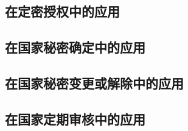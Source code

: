 \subsection{在定密授权中的应用}
\subsection{在国家秘密确定中的应用}
\subsection{在国家秘密变更或解除中的应用}
\subsection{在国家定期审核中的应用}